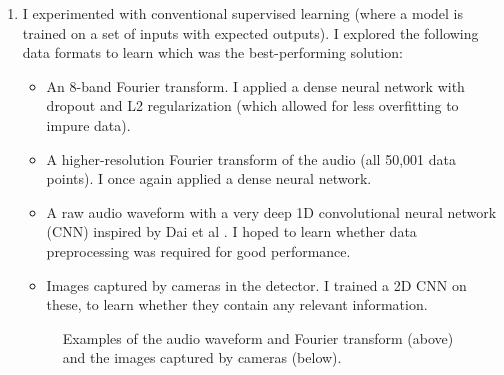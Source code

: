\documentclass[12pt]{article}
\begin{document}
\begin{enumerate}
    \item I experimented with conventional supervised learning (where a model is trained on a set of inputs with expected outputs). I explored the following data formats to learn which was the best-performing solution:
    \begin{itemize}
        \item An 8-band Fourier transform. I applied a dense neural network with dropout and L2 regularization (which allowed for less overfitting to impure data).
        \item A higher-resolution Fourier transform of the audio (all 50,001 data points). I once again applied a dense neural network.
        \item A raw audio waveform with a very deep 1D convolutional neural network (CNN) inspired by Dai et al \cite{verydeepconvnets}. I hoped to learn whether data preprocessing was required for good performance.
        \item Images captured by cameras in the detector. I trained a 2D CNN on these, to learn whether they contain any relevant information.
    \end{itemize}
    \begin{figure}[ht]
        \centering
        \qquad
        \caption{Examples of the audio waveform and Fourier transform (above) and the images captured by cameras (below).}

\end{figure}
\end{enumerate}
\end{document}
